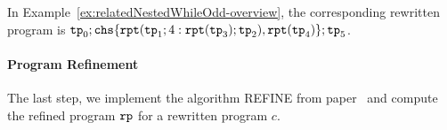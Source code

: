 In Example~\ref{ex:relatedNestedWhileOdd-overview}, the corresponding rewritten program is
$ 
\tpath_0 ; \rpchoose{ \rprepeat(\tpath_1; 4:\rprepeat(\tpath_3); \tpath_2), 
\rprepeat(\tpath_4) }; \tpath_5
$.

\paragraph{Program Refinement}
The last step, we implement the algorithm REFINE from paper~\cite{GulwaniJK09} and compute the 
refined program $\mathtt{rp}$ for a rewritten program $c$.


